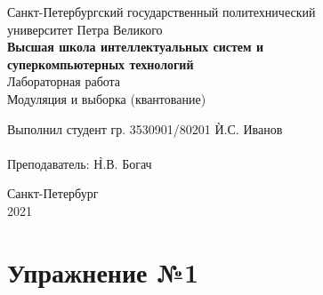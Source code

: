 \documentclass[a4paper, 14pt]{extarticle}
\begin{document}
    \begin{center}
        \begin{center}
            \hfill \break
            \normalsize{Санкт-Петербургский государственный политехнический}\\
            \normalsize{университет Петра Великого}\\
            \hfill \break
            \normalsize{\textbf{Высшая школа интеллектуальных систем и}}\\
            \normalsize{\textbf{суперкомпьютерных технологий}}\\
            \hfill \break
            \hfill \break
            \hfill \break
            \normalsize{Лабораторная работа}\\
            \hfill \break
            \normalsize{\LARGE Модуляция и выборка (квантование)}\\
        \end{center}
        \hfill \break
        \hfill \break
        \hfill \break
        \hfill \break
        \hfill \break
        \hfill \break
        \hfill \break
        \hfill \break
        \hfill \break
        \hfill \break
        \begin{tabbing}
            Выполнил студент гр. 3530901/80201 \`И.С. Иванов\\
            \\
            Преподаватель: \`Н.В. Богач\\
        \end{tabbing}
        \hfill \break
        \hfill \break
        \hfill \break
        \hfill \break
        \begin{center}
            Санкт-Петербург\\
            2021
        \end{center}
        \thispagestyle{empty}
    \end{center}

    \newpage
    \tableofcontents

    \newpage
    \listoffigures

    \newpage
    \lstlistoflistings

    \newpage


    \section{Упражнение №1}
    \label{sec:1}
\end{document}
